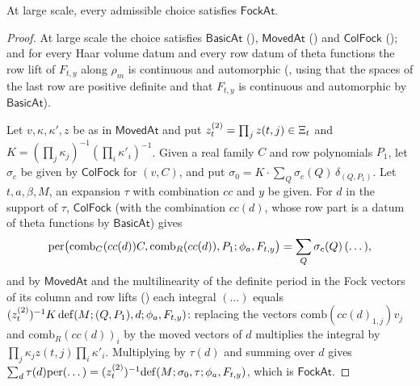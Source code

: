 \begin{proposition}\label{pf:rowprops:fockat}
At large scale, every admissible choice satisfies $\mathsf{FockAt}$.
\end{proposition}

\begin{proof}
At large scale the choice satisfies $\mathsf{BasicAt}$ (),
$\mathsf{MovedAt}$ () and $\mathsf{ColFock}$
(); and for every Haar volume datum and every row datum of
theta functions the row lift of $F_{t,y}$ along $\rho_m$ is continuous and automorphic
(, using that the spaces of the last row are positive definite and that $F_{t,y}$
is continuous and automorphic by $\mathsf{BasicAt}$).

Let $v,\kappa,\kappa',z$ be as in $\mathsf{MovedAt}$ and put $z^{(2)}_t=\prod_jz(t,j)\in\Xi_t$ and
$K=(\prod_j\kappa_j)^{-1}(\prod_i\kappa'_i)^{-1}$. Given a real family $C$ and row polynomials $P_1$, let $\sigma_c$ be given by
$\mathsf{ColFock}$ for $(v,C)$, and put $\sigma_0=K\cdot\sum_Q\sigma_c(Q)\,\delta_{(Q,P_1)}$. Let $t,a,\beta,M$, an expansion $\tau$
with combination $cc$ and $y$ be given. For $d$ in the support of $\tau$, $\mathsf{ColFock}$ (with the combination $cc(d)$, whose
row part is a datum of theta functions by $\mathsf{BasicAt}$) gives
\[
\mathrm{per}\bigl(\mathrm{comb}_C(cc(d))C,\mathrm{comb}_R(cc(d)),P_1;\phi_a,F_{t,y}\bigr)=\sum_Q\sigma_c(Q)\,(\dots),
\]
and by $\mathsf{MovedAt}$ and the multilinearity of the definite period in the Fock vectors of its column and row lifts
() each integral $(\dots)$ equals
$(z^{(2)}_t)^{-1}K\,\mathrm{def}(M;(Q,P_1),d;\phi_a,F_{t,y})$: replacing the vectors $\mathrm{comb}(cc(d)_{1,j})v_j$ and
$\mathrm{comb}_R(cc(d))_i$ by the moved vectors of $d$ multiplies the integral by $\prod_j\kappa_jz(t,j)\prod_i\kappa'_i$. Multiplying by
$\tau(d)$ and summing over $d$ gives $\sum_d\tau(d)\mathrm{per}(\dots)=(z^{(2)}_t)^{-1}\mathrm{def}(M;\sigma_0,\tau;\phi_a,F_{t,y})$,
which is $\mathsf{FockAt}$.
\end{proof}

